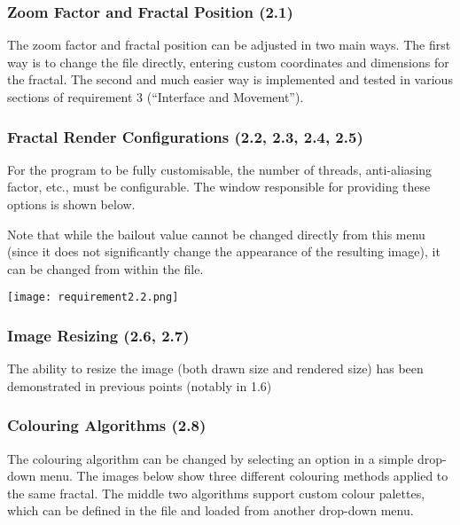 \subsubsection{Zoom Factor and Fractal Position (2.1)}

The zoom factor and fractal position can be adjusted in two main ways. The first way is to change the  file directly, entering custom coordinates and dimensions for the fractal. The second and much easier way is implemented and tested in various sections of requirement 3 (``Interface and Movement'').

\subsubsection{Fractal Render Configurations (2.2, 2.3, 2.4, 2.5)}

For the program to be fully customisable, the number of threads, anti-aliasing factor, etc., must be configurable. The window responsible for providing these options is shown below.

Note that while the bailout value cannot be changed directly from this menu (since it does not significantly change the appearance of the resulting image), it can be changed from within the  file.

\FloatBarrier
\begin{figure*}[htp]
	\centering
	\texttt{[image: requirement2.2.png]}
\end{figure*}
\FloatBarrier

\subsubsection{Image Resizing (2.6, 2.7)}

The ability to resize the image (both drawn size and rendered size) has been demonstrated in previous points (notably in 1.6)

\subsubsection{Colouring Algorithms (2.8)}

The colouring algorithm can be changed by selecting an option in a simple drop-down menu. The images below show three different colouring methods applied to the same fractal. The middle two algorithms support custom colour palettes, which can be defined in the  file and loaded from another drop-down menu.

